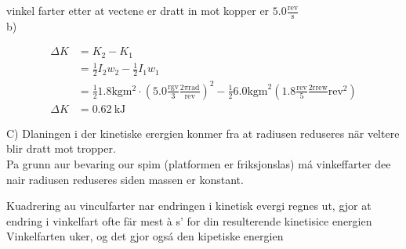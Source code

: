\documentclass[10pt]{article}
\begin{document}
vinkel farter etter at vectene er dratt in mot kopper er $5.0 \frac{\mathrm{rev}}{\mathrm{s}}$\\
b)

$$
\begin{aligned}
\Delta K & =K_{2}-K_{1} \\
& =\frac{1}{2} I_{2} w_{2}-\frac{1}{2} I_{1} w_{1} \\
& =\frac{1}{2} 1.8 \mathrm{kgm}{ }^{2} \cdot\left(5.0 \frac{\mathrm{rgv}}{3} \frac{2 \pi \mathrm{rad}}{\mathrm{rev}}\right)^{2}-\frac{1}{2} 6.0 \mathrm{kgm}^{2}\left(1.8 \frac{\mathrm{rev}}{5} \frac{2 \mathrm{rrew}}{} \mathrm{rev}^{2}\right) \\
\Delta K & =0.62 \mathrm{~kJ}
\end{aligned}
$$

C) Dlaningen i der kinetiske erergien konmer fra at radiusen reduseres när veltere blir dratt mot tropper.\\
Pa grunn aur bevaring our spim (platformen er friksjonslas) má vinkeffarter dee nair radiusen reduseres siden massen er konstant.

Kuadrering au vinculfarter nar endringen i kinetisk evergi regnes ut, gjor at endring i vinkelfart ofte fär mest à s' for din resulterende kinetisice energien\\
Vinkelfarten uker, og det gjor ogsá den kipetiske energien
\end{document}
